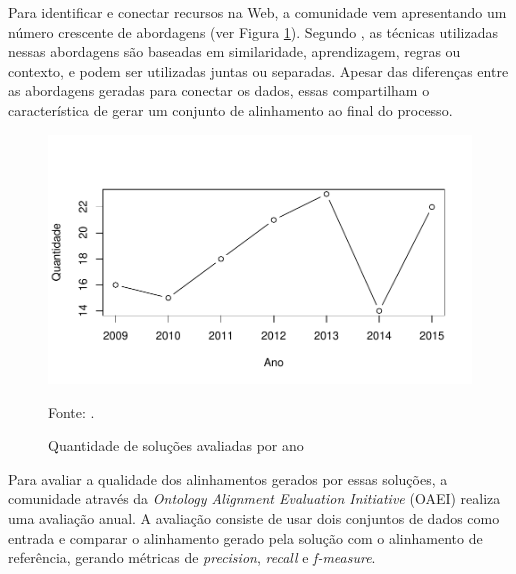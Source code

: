 Para identificar e conectar recursos na Web, a comunidade vem apresentando um número crescente de abordagens (ver Figura \ref{fig:oaei_imtools}). Segundo , as técnicas utilizadas nessas abordagens são baseadas em similaridade, aprendizagem, regras ou contexto, e podem ser utilizadas juntas ou separadas. Apesar das diferenças entre as abordagens geradas para conectar os dados, essas compartilham o característica de gerar um conjunto de alinhamento ao final do processo.

\begin{figure}[!ht]
	\centering
	\includegraphics[width=1\textwidth]{./imagens/im_tools.pdf}
    \caption{Quantidade de soluções avaliadas por ano}
	\footnotesize{Fonte: \cite{Cheatham2015}.}
	\label{fig:oaei_imtools}
\end{figure}

Para avaliar a qualidade dos alinhamentos gerados por essas soluções, a comunidade através da \textit{Ontology Alignment Evaluation Initiative} (OAEI) realiza uma avaliação anual. A avaliação consiste de usar dois conjuntos de dados como entrada e comparar o alinhamento gerado pela solução com o alinhamento de referência, gerando métricas de \textit{precision}, \textit{recall} e \textit{f-measure}.



